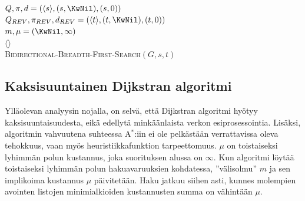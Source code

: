 \documentclass[finnish]{tktltiki2}
\newenvironment{finalgo}[1][htb]{
  \renewcommand{\algorithmcfname}{Algoritmi}
  \begin{algorithm}[#1]
}{\end{algorithm}}
\theoremstyle{definition}
\theoremstyle{remark}
\begin{document}
\begin{finalgo}[p]
  $Q, \pi, d = (\langle s \rangle, (s, \KwNil), (s, 0))$ \\
  $Q_{REV}, \pi_{REV}, d_{REV} = (\langle t \rangle, (t, \KwNil), (t, 0))$ \\
  $m, \mu = (\KwNil, \infty)$ \\
  \KwRet $\langle \rangle$ \\
\caption{\textsc{Bidirectional-Breadth-First-Search}$(G, s, t)$}
\end{finalgo}

\subsection{Kaksisuuntainen Dijkstran algoritmi}
Ylläolevan analyysin nojalla, on selvä, että Dijkstran algoritmi hyötyy kaksisuuntaisuudesta, eikä edellytä minkäänlaista verkon esiprosessointia. Lisäksi, algoritmin vahvuutena suhteessa A$^{\ast}$:iin ei ole pelkästään verrattavissa oleva tehokkuus, vaan myös heuristiikkafunktion tarpeettomuus. $\mu$ on toistaiseksi lyhimmän polun kustannus, joka suorituksen alussa on $\infty$. Kun algoritmi löytää toistaiseksi lyhimmän polun hakuavaruuksien kohdatessa, ''välisolmu'' $m$ ja sen implikoima kustannus $\mu$ päivitetään. Haku jatkuu siihen asti, kunnes molempien avointen listojen minimialkioiden kustannusten summa on vähintään $\mu$. 
\end{document}
